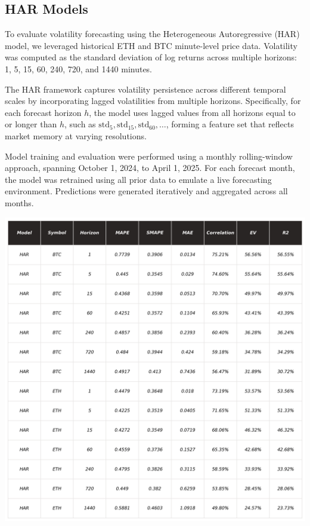 \documentclass[9pt]{article}
\begin{document}
\begin{multicols}{2}
		\subsection{HAR Models}
		
		To evaluate volatility forecasting using the Heterogeneous Autoregressive (HAR) model, we leveraged historical ETH and BTC minute-level price data. Volatility was computed as the standard deviation of log returns across multiple horizons: 1, 5, 15, 60, 240, 720, and 1440 minutes.
		
		\smallskip
		
		The HAR framework captures volatility persistence across different temporal scales by incorporating lagged volatilities from multiple horizons. Specifically, for each forecast horizon \( h \), the model uses lagged values from all horizons equal to or longer than \( h \), such as \( \text{std}_{5}, \text{std}_{15}, \text{std}_{60}, \ldots \), forming a feature set that reflects market memory at varying resolutions.
		
		Model training and evaluation were performed using a monthly rolling-window approach, spanning October 1, 2024, to April 1, 2025. For each forecast month, the model was retrained using all prior data to emulate a live forecasting environment. Predictions were generated iteratively and aggregated across all months.
		
		\centering
		\includegraphics[width=.99\columnwidth]{img/_KPI_HAR.png}
		\label{fig:_KPI_HAR}
		\justifying
		\medskip
		

\end{multicols}
\end{document}
